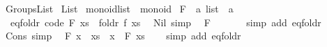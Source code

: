 %
\begin{isabellebody}%
%
%
\isadelimdocument
%
\endisadelimdocument
%
\isatagdocument
%
\isamarkuptrue%
%
\endisatagdocument
{\isafolddocument}%
%
\isadelimdocument
%
\endisadelimdocument
%
\isadelimtheory
%
\endisadelimtheory
%
\isatagtheory
{}\isamarkupfalse%
\ Groups{\isacharunderscore}{\kern0pt}List\isanewline
{}\ List\isanewline
{}%
\endisatagtheory
{\isafoldtheory}%
%
\isadelimtheory
\isanewline
%
\endisadelimtheory
\isanewline
{}\isamarkupfalse%
\ monoid{\isacharunderscore}{\kern0pt}list\ {\isacharequal}{\kern0pt}\ monoid\isanewline
{}\isanewline
\isanewline
{}\isamarkupfalse%
\ F\ {\isacharcolon}{\kern0pt}{\isacharcolon}{\kern0pt}\ {\isachardoublequoteopen}{\isacharprime}{\kern0pt}a\ list\ {\isasymRightarrow}\ {\isacharprime}{\kern0pt}a{\isachardoublequoteclose}\isanewline
{}\isanewline
\ \ eq{\isacharunderscore}{\kern0pt}foldr\ {\isacharbrackleft}{\kern0pt}code{\isacharbrackright}{\kern0pt}{\isacharcolon}{\kern0pt}\ {\isachardoublequoteopen}F\ xs\ {\isacharequal}{\kern0pt}\ foldr\ f\ xs\ \isanewline
\isanewline
{}\isamarkupfalse%
\ Nil\ {\isacharbrackleft}{\kern0pt}simp{\isacharbrackright}{\kern0pt}{\isacharcolon}{\kern0pt}\isanewline
\ \ {\isachardoublequoteopen}F\ {\isacharbrackleft}{\kern0pt}{\isacharbrackright}{\kern0pt}\ {\isacharequal}{\kern0pt}\ \isanewline
%
\isadelimproof
\ \ %
\endisadelimproof
%
\isatagproof
{}\isamarkupfalse%
\ {\isacharparenleft}{\kern0pt}simp\ add{\isacharcolon}{\kern0pt}\ eq{\isacharunderscore}{\kern0pt}foldr{\isacharparenright}{\kern0pt}%
\endisatagproof
{\isafoldproof}%
%
\isadelimproof
\isanewline
%
\endisadelimproof
\isanewline
{}\isamarkupfalse%
\ Cons\ {\isacharbrackleft}{\kern0pt}simp{\isacharbrackright}{\kern0pt}{\isacharcolon}{\kern0pt}\isanewline
\ \ {\isachardoublequoteopen}F\ {\isacharparenleft}{\kern0pt}x\ {\isacharhash}{\kern0pt}\ xs{\isacharparenright}{\kern0pt}\ {\isacharequal}{\kern0pt}\ x\ \isactrlbold {\isacharasterisk}{\kern0pt}\ F\ xs{\isachardoublequoteclose}\isanewline
%
\isadelimproof
\ \ %
\endisadelimproof
%
\isatagproof
{}\isamarkupfalse%
\ {\isacharparenleft}{\kern0pt}simp\ add{\isacharcolon}{\kern0pt}\ eq{\isacharunderscore}{\kern0pt}foldr{\isacharparenright}{\kern0pt}%

\end{isabellebody}
